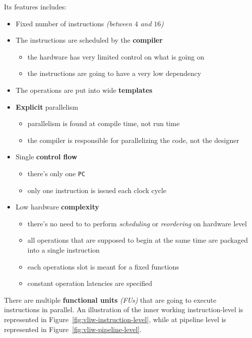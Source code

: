\documentclass[english]{article}
\begin{document}
\bigskip
Its features includes:

\begin{itemize}
  \item Fixed number of instructions \textit{(between \(4\) and \(16\))}
  \item The instructions are scheduled by the \textbf{compiler}
        \begin{itemize}
          \item the hardware has very limited control on what is going on
          \item the instructions are going to have a very low dependency
        \end{itemize}
  \item The operations are put into wide \textbf{templates}
  \item \textbf{Explicit} parallelism
        \begin{itemize}
          \item parallelism is found at compile time, not run time
          \item the compiler is responsible for parallelizing the code, not the designer
        \end{itemize}
  \item Single \textbf{control flow}
        \begin{itemize}
          \item there's only one \texttt{PC}
          \item only one instruction is issued each clock cycle
        \end{itemize}
  \item Low hardware \textbf{complexity}
        \begin{itemize}
          \item there's no need to to perform \textit{scheduling} or \textit{reordering} on hardware level
          \item all operations that are supposed to begin at the same time are packaged into a single instruction
          \item each operations slot is meant for a fixed functions
          \item constant operation latencies are specified
        \end{itemize}
\end{itemize}

There are multiple \textbf{functional units} \textit{(FUs)} that are going to execute instructions in parallel.
An illustration of the inner working instruction-level is represented in Figure~\ref{fig:vliw-instruction-level}, while at pipeline level is represented in Figure~\ref{fig:vliw-pipeline-level}.
\end{document}
